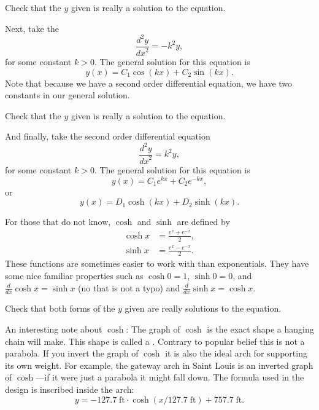 \begin{exercise}
Check that the $y$ given is really a solution to the equation.
\end{exercise}

Next, take the
\emph{}
\begin{equation*}
\frac{d^2y}{{dx}^2} = -k^2 y ,
\end{equation*}
for some constant $k > 0$.
The general solution for this equation is
\begin{equation*}
y(x) = C_1 \cos(kx) + C_2 \sin(kx) .
\end{equation*}
Note that
because
we have a second order differential equation,
we have two constants in our general solution.

\begin{exercise}
Check that the $y$ given is really a solution to the equation.
\end{exercise}

And finally, take the second order differential equation
\begin{equation*}
\frac{d^2y}{{dx}^2} = k^2 y ,
\end{equation*}
for some constant $k > 0$.
The general solution for this equation is
\begin{equation*}
y(x) = C_1 e^{kx} + C_2 e^{-kx} ,
\end{equation*}
or
\begin{equation*}
y(x) = D_1 \cosh(kx) + D_2 \sinh(kx) .
\end{equation*}

For those that do not know, $\cosh$ and $\sinh$ are defined by
\begin{align*}
\cosh x &= \frac{e^{x} + e^{-x}}{2} , \\
\sinh x &= \frac{e^{x} - e^{-x}}{2} .
\end{align*}
These functions are sometimes easier to
work with than exponentials.  They have some nice familiar
properties such as
$\cosh 0 = 1$, $\sinh 0 = 0$, and $\frac{d}{dx} \cosh x = \sinh x$ (no that is
not a typo)
and $\frac{d}{dx} \sinh x = \cosh x$.

\begin{exercise}
Check that both forms of the $y$ given are
really solutions to the equation.
\end{exercise}

An interesting note about $\cosh$:  The graph of $\cosh$ is the exact shape
a hanging chain will make.  This shape is called
a \emph{}.
Contrary to popular belief this is not a
parabola.  If you invert the graph of $\cosh$ it is also the ideal arch for
supporting its own weight.
For example, the gateway arch in Saint Louis is an inverted graph of
$\cosh$---if it were just a parabola it might fall down.  The formula
used in the design is
inscribed inside the arch:
\begin{equation*}
y = -127.7 \; \textrm{ft} \cdot \cosh({x / 127.7  \; \textrm{ft}}) + 757.7 \;
\textrm{ft} .
\end{equation*}


